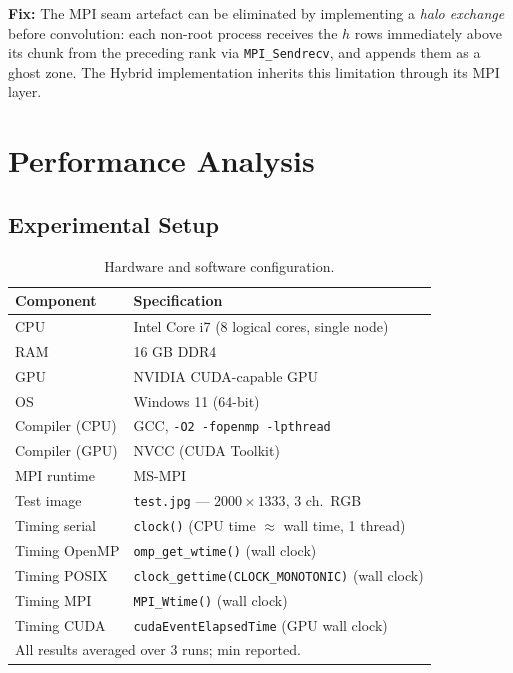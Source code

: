 \documentclass[12pt,a4paper]{article}
\begin{document}
\begin{notebox}
\textbf{Fix:} The MPI seam artefact can be eliminated by implementing a
\emph{halo exchange} before convolution: each non-root process receives the
$h$ rows immediately above its chunk from the preceding rank via
\texttt{MPI\_Sendrecv}, and appends them as a ghost zone. The Hybrid
implementation inherits this limitation through its MPI layer.
\end{notebox}

\section{Performance Analysis}

\subsection{Experimental Setup}

\begin{table}[H]
\centering
\caption{Hardware and software configuration.}
\label{tab:setup}
\begin{tabular}{ll}
\toprule
\textbf{Component} & \textbf{Specification} \\
\midrule
CPU            & Intel Core i7 (8 logical cores, single node) \\
RAM            & 16 GB DDR4 \\
GPU            & NVIDIA CUDA-capable GPU \\
OS             & Windows 11 (64-bit) \\
Compiler (CPU) & GCC, \texttt{-O2 -fopenmp -lpthread} \\
Compiler (GPU) & NVCC (CUDA Toolkit) \\
MPI runtime    & MS-MPI \\
Test image     & \texttt{test.jpg} --- $2000\!\times\!1333$, 3 ch.\ RGB \\
Timing serial  & \texttt{clock()} (CPU time $\approx$ wall time, 1 thread) \\
Timing OpenMP  & \texttt{omp\_get\_wtime()} (wall clock) \\
Timing POSIX   & \texttt{clock\_gettime(CLOCK\_MONOTONIC)} (wall clock) \\
Timing MPI     & \texttt{MPI\_Wtime()} (wall clock) \\
Timing CUDA    & \texttt{cudaEventElapsedTime} (GPU wall clock) \\
\midrule
\multicolumn{2}{l}{\small All results averaged over 3 runs; min reported.} \\
\bottomrule
\end{tabular}
\end{table}
\end{document}
